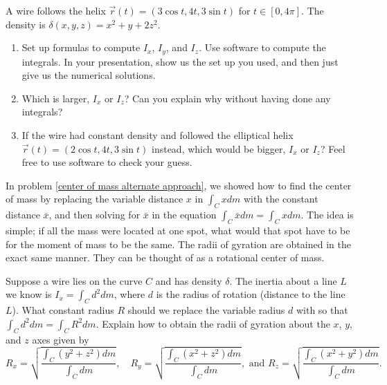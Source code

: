 
\begin{problem}
 A wire follows the helix $\vec r(t) = (3\cos t, 4t, 3\sin t)$ for $t\in[0,4\pi]$. The density is $\delta(x,y,z) = x^2+y+2z^2$. 
\begin{enumerate}
 \item Set up formulas to compute $I_x$, $I_y$, and $I_z$. Use software to compute the integrals. In your presentation, show us the set up you used, and then just give us the numerical solutions. 
 \item Which is larger, $I_x$ or $I_z$? Can you explain why without having done any integrals?
 \item {}%
If the wire had constant density and followed the elliptical helix $\vec r(t) = (2\cos t, 4t, 3\sin t)$ instead, which would be bigger, $I_x$ or $I_z$?  Feel free to use software to check your guess. 
\end{enumerate}
\end{problem}


 In problem \ref{center of mass alternate approach}, we showed how to find the center of mass by replacing the variable distance $x$ in $\int_C x dm$ with the constant distance $\bar x$, and then solving for $\bar x$ in the equation $\int_C \bar xdm = \int_C x dm$. The idea is simple; if all the mass were located at one spot, what would that spot have to be for the moment of mass to be the same.  The radii of gyration are obtained in the exact same manner.  They can be thought of as a rotational center of mass.
\begin{problem}%
%
Suppose a wire lies on the curve $C$ and has density $\delta$. The inertia about a line $L$ we know is $I_x=\int_C d^2 dm$, where $d$ is the radius of rotation (distance to the line $L$).  What constant radius $R$ should we replace the variable radius $d$ with so that $\int_C d^2 dm = \int_C R^2 dm$.  Explain how to obtain the radii of gyration about the $x$, $y$, and $z$ axes given by 
$$
R_x = \sqrt{\frac{\int_C (y^2+z^2)dm}{\int_C dm}},\quad
R_y = \sqrt{\frac{\int_C (x^2+z^2)dm}{\int_C dm}},
\text{ and }
R_z = \sqrt{\frac{\int_C (x^2+y^2)dm}{\int_C dm}}.
$$
\end{problem}

